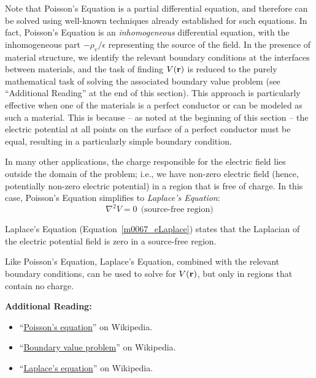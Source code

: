 Note that Poisson's Equation is a partial differential equation, and therefore can be solved using well-known techniques already established for such equations.
In fact, Poisson's Equation is an \emph{inhomogeneous} differential equation, with the inhomogeneous part $-\rho_v/\epsilon$ representing the source of the field.  
In the presence of material structure, we identify the relevant boundary conditions at the interfaces between materials, and the task of finding $V({\bf r})$ is reduced to the purely mathematical task of solving the associated boundary value problem (see ``Additional Reading'' at the end of this section).  This approach is particularly effective when one of the materials is a perfect conductor or can be modeled as such a material.
This is because -- as noted at the beginning of this section -- the electric potential at all points on the surface of a perfect conductor must be equal, resulting in a particularly simple boundary condition.  
  
In many other applications, the charge responsible for the electric field lies outside the domain of the problem; i.e., we have non-zero electric field (hence, potentially non-zero electric potential) in a region that is free of charge.  In this case, Poisson's Equation simplifies to \emph{Laplace's Equation}: 
%
\begin{equation}
\boxed{
\nabla^2 V = 0 ~~\mbox{(source-free region)}
}
\label{m0067_eLaplace}
\end{equation}
%
\begin{mdframed}[backgroundcolor=yellow!20,nobreak=true] 
Laplace's Equation (Equation~\ref{m0067_eLaplace}) states that the Laplacian of the electric potential field is zero in a source-free region. 
\end{mdframed}
%
Like Poisson's Equation, Laplace's Equation, combined with the relevant boundary conditions, can be used to solve for $V({\bf r})$, but only in regions that contain no charge.


{\bf Additional Reading:}
\begin{itemize}
\item ``\href{https://en.wikipedia.org/wiki/Poisson's_equation}{Poisson's equation}'' on Wikipedia.
\item ``\href{https://en.wikipedia.org/wiki/Boundary_value_problem}{Boundary value problem}'' on Wikipedia.
\item ``\href{https://en.wikipedia.org/wiki/Laplace's_equation}{Laplace's equation}'' on Wikipedia.
\end{itemize}




